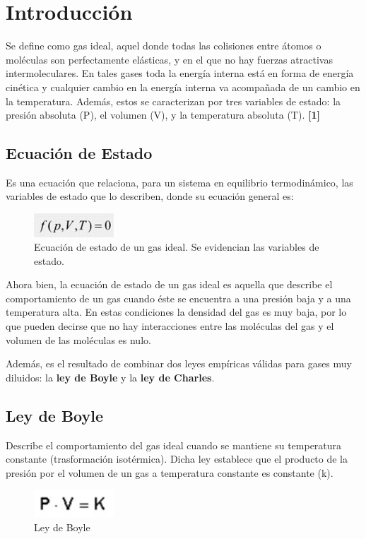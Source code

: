 \documentclass[journal,transmag]{IEEEtran}
\begin{document}
\section{Introducción}
	
	Se define como gas ideal, aquel donde todas las colisiones entre átomos o moléculas son perfectamente elásticas, y en el que no hay fuerzas atractivas intermoleculares. En tales gases toda la energía interna está en forma de energía cinética y cualquier cambio en la energía interna va acompañada de un cambio en la temperatura. Además, estos se caracterizan por tres variables de estado: la presión absoluta (P), el volumen (V), y la temperatura absoluta (T).  \textbf{[1]}
	
\subsection{Ecuación de Estado}
Es una ecuación que relaciona, para un sistema en equilibrio termodinámico, las variables de estado que lo describen, donde su ecuación general es: 
 \begin{figure}[!h]
			\center
			\includegraphics[width=3cm]{img/1.jpeg}
			\caption{Ecuación de estado de un gas ideal. Se evidencian las 	variables de estado.}
			\label{f1}
		\end{figure}

Ahora bien, la ecuación de estado de un gas ideal es aquella que describe el comportamiento de un gas cuando éste se encuentra a una presión baja y a una temperatura alta. En estas condiciones la densidad del gas es muy baja, por lo que pueden decirse que no hay interacciones entre las moléculas del gas y el volumen de las moléculas es nulo.

Además, es el resultado de combinar dos leyes empíricas válidas para gases muy diluidos: la \textbf{ley de Boyle} y la \textbf{ley de Charles}.

\subsection{\textbf{Ley de Boyle}}
	Describe el comportamiento del gas ideal cuando se mantiene su temperatura constante (trasformación isotérmica). Dicha ley establece que el producto de la presión por el volumen de un gas a temperatura constante es constante (k). 
	\begin{figure}[!h]
				\center
				\includegraphics[width=3cm]{img/2.jpeg}
				\caption{Ley de Boyle}
				\label{f2}
	\end{figure}
\end{document}
